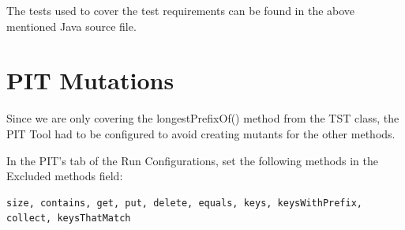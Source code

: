 \documentclass[12pt]{article}
\begin{document}
The tests used to cover the test requirements can be found in the above mentioned Java source file.

\section{PIT Mutations}
Since we are only covering the longestPrefixOf() method from the TST class, the PIT Tool had to be configured to avoid creating mutants for the other methods.

In the PIT’s tab of the Run Configurations, set the following methods in the Excluded methods field:

\begin{lstlisting}
size, contains, get, put, delete, equals, keys, keysWithPrefix, collect, keysThatMatch
\end{lstlisting} 
\end{document}
